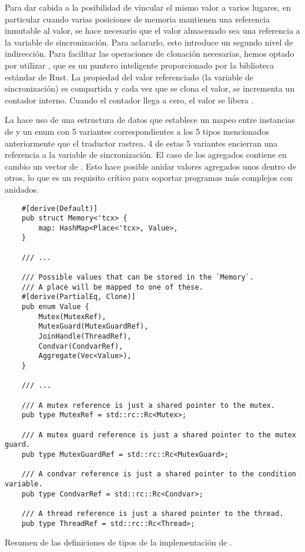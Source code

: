Para dar cabida a la posibilidad de vincular el mismo valor a varios lugares, en particular
cuando varias posiciones de memoria mantienen una referencia inmutable al valor, se hace
necesario que el valor almacenado sea una referencia a la variable de sincronización. Para
aclararlo, esto introduce un segundo nivel de indirección. Para facilitar las operaciones de
clonación necesarias, hemos optado por utilizar , que es un puntero inteligente
proporcionado por la biblioteca estándar de Rust. La propiedad del valor referenciado (la
variable de sincronización) es compartida y cada vez que se clona el valor, se incrementa un
contador interno. Cuando el contador llega a cero, el valor se libera \cite[Chap. 15.4]{rust-book}.

La  hace uso de una estructura de datos 
que establece un mapeo entre instancias de 
y un enum con 5 variantes correspondientes a
los 5 tipos mencionados anteriormente que el traductor rastrea. 4 de estas 5 variantes
encierran una referencia  a la variable de sincronización. El caso de los agregados
contiene en cambio un vector de . Esto hace posible anidar valores agregados unos dentro de
otros, lo que es un requisito crítico para soportar programas más complejos con 
anidados.

\begin{listing}[!htb]
  \begin{verbatim}
    #[derive(Default)]
    pub struct Memory<'tcx> {
        map: HashMap<Place<'tcx>, Value>,
    }

    /// ...

    /// Possible values that can be stored in the `Memory`.
    /// A place will be mapped to one of these.
    #[derive(PartialEq, Clone)]
    pub enum Value {
        Mutex(MutexRef),
        MutexGuard(MutexGuardRef),
        JoinHandle(ThreadRef),
        Condvar(CondvarRef),
        Aggregate(Vec<Value>),
    }

    /// ...
    
    /// A mutex reference is just a shared pointer to the mutex.
    pub type MutexRef = std::rc::Rc<Mutex>;

    /// A mutex guard reference is just a shared pointer to the mutex guard.
    pub type MutexGuardRef = std::rc::Rc<MutexGuard>;

    /// A condvar reference is just a shared pointer to the condition variable.
    pub type CondvarRef = std::rc::Rc<Condvar>;

    /// A thread reference is just a shared pointer to the thread.
    pub type ThreadRef = std::rc::Rc<Thread>;
  \end{verbatim}
  \caption{Resumen de las definiciones de tipos de la implementación de .}
  \label{lst:memory-implementation}
\end{listing}

